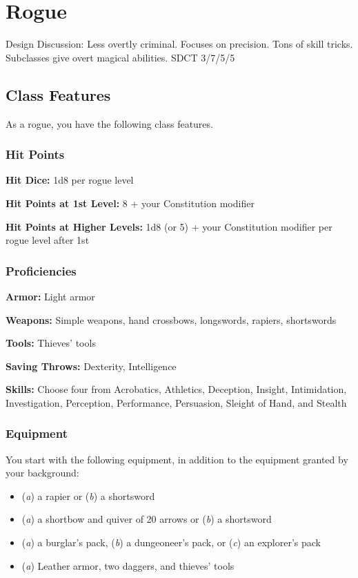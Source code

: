 \section{Rogue}
\label{cls:rogue}

Design Discussion: Less overtly criminal. Focuses on precision. Tons of skill tricks. Subclasses give overt magical abilities. SDCT 3/7/5/5
\subsection{Class Features}

As a rogue, you have the following class features.

\subsubsection{Hit Points}

\textbf{Hit Dice:} 1d8 per rogue level

\textbf{Hit Points at 1st Level:} 8 + your Constitution modifier

\textbf{Hit Points at Higher Levels:} 1d8 (or 5) + your Constitution modifier per rogue level after 1st

\subsubsection{Proficiencies}

\textbf{Armor:} Light armor

\textbf{Weapons:} Simple weapons, hand crossbows, longswords, rapiers, shortswords

\textbf{Tools:} Thieves' tools

\textbf{Saving Throws:} Dexterity, Intelligence

\textbf{Skills:} Choose four from Acrobatics, Athletics, Deception, Insight, Intimidation, Investigation, Perception, Performance, Persuasion, Sleight of Hand, and Stealth

\subsubsection{Equipment}

You start with the following equipment, in addition to the equipment granted by your background:
\begin{itemize}
	\item (\textit{a}) a rapier or (\textit{b}) a shortsword
	\item (\textit{a}) a shortbow and quiver of 20 arrows or (\textit{b}) a shortsword
	\item (\textit{a}) a burglar's pack, (\textit{b}) a dungeoneer's pack, or (\textit{c}) an explorer's pack
  \item (\textit{a}) Leather armor, two daggers, and thieves' tools
\end{itemize}

